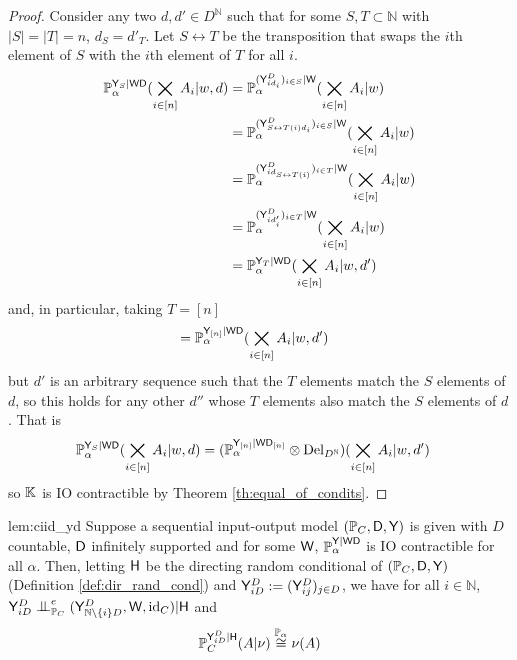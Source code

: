 \begin{proof}
Consider any two $d,d'\in D^{\mathbb{N}}$ such that for some $S,T\subset\mathbb{N}$ with $|S|=|T|=n$, $d_S=d'_T$. Let $S\leftrightarrow T$ be the transposition that swaps the $i$th element of $S$ with the $i$th element of $T$ for all $i$.
\begin{align}
    \mathbb{P}_\alpha^{\mathsf{Y}_S|\mathsf{WD}}(\bigtimes_{i\in [n]} A_i|w,d) &= \mathbb{P}_\alpha^{(\mathsf{Y}^D_{i d_i})_{i\in S}|\mathsf{W}} (\bigtimes_{i\in [n]} A_i|w)\\
    &= \mathbb{P}_\alpha^{(\mathsf{Y}^D_{S\leftrightarrow T(i) d_i})_{i\in S}|\mathsf{W}} (\bigtimes_{i\in [n]} A_i|w)\\
    &= \mathbb{P}_\alpha^{(\mathsf{Y}^D_{i d_{S\leftrightarrow T(i)}})_{i\in T}|\mathsf{W}} (\bigtimes_{i\in [n]} A_i|w)\\
    &= \mathbb{P}_\alpha^{(\mathsf{Y}^D_{i d'_{i}})_{i\in T}|\mathsf{W}} (\bigtimes_{i\in [n]} A_i|w)\\
    &=  \mathbb{P}_\alpha^{\mathsf{Y}_T|\mathsf{WD}}(\bigtimes_{i\in [n]} A_i|w,d')
\end{align}
and, in particular, taking $T=[n]$
\begin{align}
    &= \mathbb{P}_\alpha^{\mathsf{Y}_{[n]}|\mathsf{WD}} (\bigtimes_{i\in [n]} A_i|w,d')
\end{align}
but $d'$ is an arbitrary sequence such that the $T$ elements match the $S$ elements of $d$, so this holds for any other $d''$ whose $T$ elements also match the $S$ elements of $d$. That is
\begin{align}
    \mathbb{P}_\alpha^{\mathsf{Y}_S|\mathsf{WD}}(\bigtimes_{i\in [n]} A_i|w,d)&= (\mathbb{P}_\alpha^{\mathsf{Y}_{[n]}|\mathsf{WD}_{[n]}}\otimes \mathrm{Del}_{D^{\mathbb{N}}}) (\bigtimes_{i\in [n]} A_i|w,d')
\end{align}
so $\mathbb{K}$ is IO contractible by Theorem \ref{th:equal_of_condits}.
\end{proof}

\begin{replemma}{lem:ciid_yd}
Suppose a sequential input-output model $(\mathbb{P}_C,\mathsf{D},\mathsf{Y})$ is given with $D$ countable, $\mathsf{D}$ infinitely supported and for some $\mathsf{W}$, $\mathbb{P}_\alpha^{\mathsf{Y}|\mathsf{WD}}$ is IO contractible for all $\alpha$. Then, letting $\mathsf{H}$ be the directing random conditional of $(\mathbb{P}_C,\mathsf{D},\mathsf{Y})$ (Definition \ref{def:dir_rand_cond}) and $\mathsf{Y}^D_{iD}:=(\mathsf{Y}^D_{ij})_{j\in D}$, we have for all $i\in\mathbb{N}$, $\RV{Y}^D_{iD}\CI^e_{\prob{P}_C} (\RV{Y}^D_{\mathbb{N}\setminus\{i\}D},\RV{W},\text{id}_C) | \RV{H}$ and
\begin{align}
    \mathbb{P}_C^{\mathsf{Y}^D_{iD}|\mathsf{H}}(A|\nu) \overset{\mathbb{P}_\alpha}{\cong} \nu(A)
\end{align}
\end{replemma}

